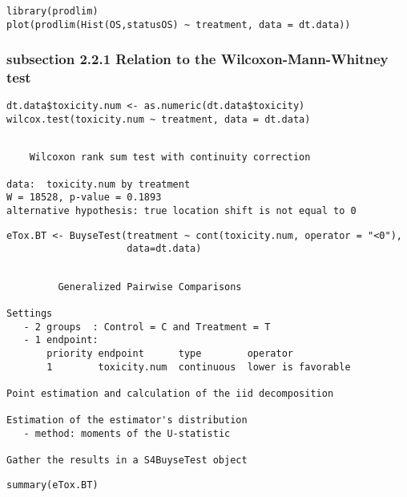 \documentclass[12pt]{article}
\begin{document}
\lstset{language=r,label= ,caption= ,captionpos=b,numbers=none}
\begin{lstlisting}
library(prodlim)
plot(prodlim(Hist(OS,statusOS) ~ treatment, data = dt.data))
\end{lstlisting}

\subsubsection{subsection 2.2.1 Relation to the Wilcoxon-Mann-Whitney test}
\label{sec:orgdacfadd}

\lstset{language=r,label= ,caption= ,captionpos=b,numbers=none}
\begin{lstlisting}
dt.data$toxicity.num <- as.numeric(dt.data$toxicity)
wilcox.test(toxicity.num ~ treatment, data = dt.data)
\end{lstlisting}

\begin{verbatim}

	Wilcoxon rank sum test with continuity correction

data:  toxicity.num by treatment
W = 18528, p-value = 0.1893
alternative hypothesis: true location shift is not equal to 0
\end{verbatim}


\lstset{language=r,label= ,caption= ,captionpos=b,numbers=none}
\begin{lstlisting}
eTox.BT <- BuyseTest(treatment ~ cont(toxicity.num, operator = "<0"),
                     data=dt.data)
\end{lstlisting}

\begin{verbatim}

         Generalized Pairwise Comparisons

Settings 
   - 2 groups  : Control = C and Treatment = T
   - 1 endpoint: 
       priority endpoint      type        operator           
       1        toxicity.num  continuous  lower is favorable 

Point estimation and calculation of the iid decomposition

Estimation of the estimator's distribution 
   - method: moments of the U-statistic

Gather the results in a S4BuyseTest object
\end{verbatim}

\lstset{language=r,label= ,caption= ,captionpos=b,numbers=none}
\begin{lstlisting}
summary(eTox.BT)
\end{lstlisting}
\end{document}
